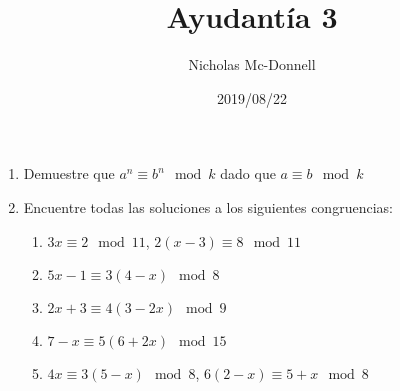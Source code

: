 \documentclass{ayudantia}
\title{Ayudantía 3}
\date{2019/08/22}
\author{Nicholas Mc-Donnell}
\begin{document}
\maketitle
\begin{enumerate}
    \item Demuestre que \(a^n\equiv b^n\mod k\) dado que \(a\equiv b\mod k\)
    \item Encuentre todas las soluciones a los siguientes congruencias:
    \begin{enumerate}
        \item \(3x\equiv 2\mod 11\), \(2(x-3)\equiv 8\mod 11\)
        \item \(5x-1\equiv 3(4-x)\mod 8\)
        \item \(2x+3\equiv 4(3-2x)\mod 9\)
        \item \(7-x\equiv 5(6+2x)\mod 15\)
        \item \(4x\equiv 3(5-x)\mod 8\), \(6(2-x)\equiv 5+x\mod 8\)
    \end{enumerate}
\end{enumerate}
\end{document}

